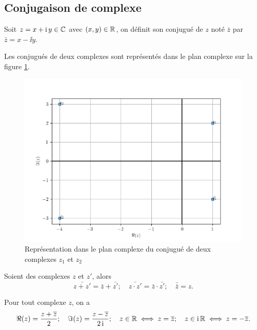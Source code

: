 \subsection{Conjugaison de complexe}
\label{subsec:conjugaisoncomplexe}

\begin{defdef}
    Soit \(z = x + \operatorname{i} y \in \mathbb{C}\) avec \((x, y)\in \mathbb{R}\), on définit son conjugué de 
    \(z\) noté \(\bar{z}\) par \(\bar{z} = x- \ii y\).
\end{defdef}
Les conjugués de deux complexes sont représentés dans le plan complexe sur la 
figure \ref{fig:conjugueComplexe}.

\begin{figure}
    \centering
    \includegraphics[scale = 0.8]{conjugue.png}
    \caption{Représentation dans le plan complexe du conjugué de deux complexes 
    $z_1$ et $z_2$}
    \label{fig:conjugueComplexe}
\end{figure}

\begin{prop}
    Soient des complexes \(z\) et \(z'\), alors
    \begin{equation}
        \bar{z + z'} = \bar{z} + \bar{z'}; \quad \bar{z \cdot z'} = \bar{z} \cdot 
        \bar{z'}; \quad \bar{\bar{z}} = z.
    \end{equation}
\end{prop}

\begin{prop}
    Pour tout complexe \(z\), on a
    \begin{equation}
        \Re(z) = \frac{z + \overline{z}}{2}; \quad \Im(z) = \frac{z-\overline{z}}{2 \operatorname{i}}; \quad 
        z \in \mathbb{R} \iff z = \overline{z}; \quad z \in \operatorname{i}\mathbb{R} \iff z = -\overline{z}.
    \end{equation}
\end{prop}

